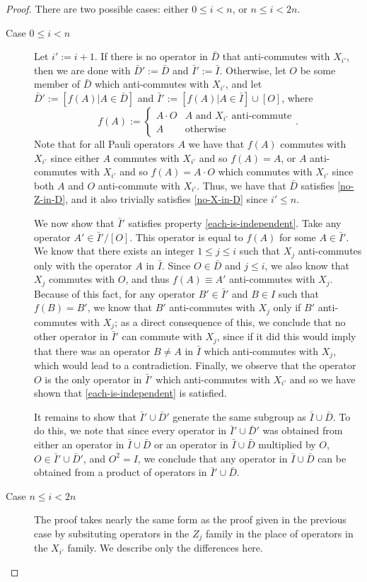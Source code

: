 \documentclass[twocolumn,showpacs,preprintnumbers,amsmath,amssymb,nofootinbib,pra,floatfix]{revtex4}
\begin{document}
\begin{proof}
There are two possible cases:  either $0\le i<n$, or $n\le i < 2n$.
\begin{description}
\item[Case $0\le i<n$] Let $i':=i+1$.  If there is no operator in $\bar D$ that anti-commutes with $X_{i'}$, then we are done with $\bar D':=\bar D$ and $\bar I':=\bar I$.  Otherwise, let $O$ be some member of $\bar D$ which anti-commutes with $X_{i'}$, and let $\bar D':=[f(A)|A\in \bar D]$ and $\bar I':=[f(A)|A\in\bar I]\cup[O]$, where
$$f(A):=\begin{cases}
A\cdot O & \text{$A$ and $X_{i'}$ anti-commute}\\
A & \text{otherwise}
\end{cases}.$$
Note that for all Pauli operators $A$ we have that $f(A)$ commutes with $X_{i'}$ since either $A$ commutes with $X_{i'}$ and so $f(A)=A$, or $A$ anti-commutes with $X_{i'}$ and so $f(A)=A\cdot O$ which commutes with $X_{i'}$ since both $A$ and $O$ anti-commute with $X_{i'}$.  Thus, we have that $\bar D$ satisfies \ref{no-Z-in-D}, and it also trivially satisfies \ref{no-X-in-D} since $i'\le n$.

We now show that $\bar I'$ satisfies property \ref{each-is-independent}.  Take any operator $A'\in\bar I'\slash[O]$.  This operator is equal to $f(A)$ for some $A\in \bar I'$.  We know that there exists an integer $1\le j \le i$ such that $X_j$ anti-commutes only with the operator $A$ in $\bar I$.  Since $O\in \bar D$ and $j\le i$, we also know that $X_j$ commutes with $O$, and thus $f(A)\equiv A'$ anti-commutes with $X_j$.  Because of this fact, for any operator $B'\in\bar I'$ and $B\in I$ such that $f(B)=B'$, we know that $B'$ anti-commutes with $X_j$ only if $B'$ anti-commutes with $X_j$;  as a direct consequence of this, we conclude that no other operator in $\bar I'$ can commute with $X_j$, since if it did this would imply that there was an operator $B\ne A$ in $\bar I$ which anti-commutes with $X_j$, which would lead to a contradiction.  Finally, we observe that the operator $O$ is the only operator in $\bar I'$ which anti-commutes with $X_{i'}$ and so we have shown that \ref{each-is-independent} is satisfied.

It remains to show that $\bar I'\cup \bar D'$ generate the same subgroup as $\bar I \cup \bar D$.  To do this, we note that since every operator in $\bar I'\cup \bar D'$ was obtained from either an operator in $\bar I\cup \bar D$ or an operator in $\bar I\cup\bar D$ multiplied by $O$, $O\in\bar I'\cup \bar D'$, and $O^2=I$, we conclude that any operator in $\bar I\cup \bar D$ can be obtained from a product of operators in $\bar I'\cup \bar D$.
\item[Case $n\le i<2n$] 
The proof takes nearly the same form as the proof given in the previous case by subsituting operators in the $Z_j$ family in the place of operators in the $X_{i'}$ family.  We describe only the differences here.


\end{description}
\end{proof}
\end{document}

